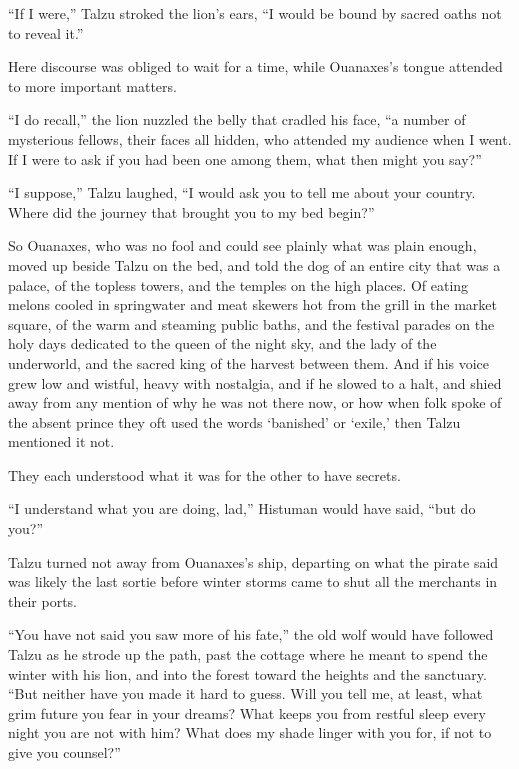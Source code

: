 ``If I were,'' Talzu stroked the lion's ears, ``I would be bound by sacred oaths not to reveal it.''

Here discourse was obliged to wait for a time, while Ouanaxes's tongue attended to more important matters.

``I do recall,'' the lion nuzzled the belly that cradled his face, ``a number of mysterious fellows, their faces all hidden, who attended my audience when I went. If I were to ask if you had been one among them, what then might you say?''

``I suppose,'' Talzu laughed, ``I would ask you to tell me about your country. Where did the journey that brought you to my bed begin?''

So Ouanaxes, who was no fool and could see plainly what was plain enough, moved up beside Talzu on the bed, and told the dog of an entire city that was a palace, of the topless towers, and the temples on the high places. Of eating melons cooled in springwater and meat skewers hot from the grill in the market square, of the warm and steaming public baths, and the festival parades on the holy days dedicated to the queen of the night sky, and the lady of the underworld, and the sacred king of the harvest between them. And if his voice grew low and wistful, heavy with nostalgia, and if he slowed to a halt, and shied away from any mention of why he was not there now, or how when folk spoke of the absent prince they oft used the words `banished' or `exile,' then Talzu mentioned it not.

They each understood what it was for the other to have secrets.

\secdiv

``I understand what you are doing, lad,'' Histuman would have said, ``but do you?''

Talzu turned not away from Ouanaxes's ship, departing on what the pirate said was likely the last sortie before winter storms came to shut all the merchants in their ports.

``You have not said you saw more of his fate,'' the old wolf would have followed Talzu as he strode up the path, past the cottage where he meant to spend the winter with his lion, and into the forest toward the heights and the sanctuary. ``But neither have you made it hard to guess. Will you tell me, at least, what grim future you fear in your dreams? What keeps you from restful sleep every night you are not with him? What does my shade linger with you for, if not to give you counsel?''

